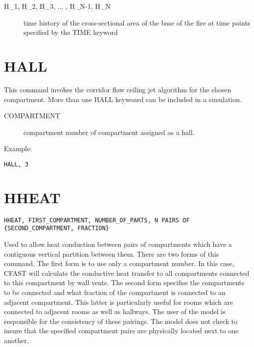 \begin{adjustwidth}{1cm}{0cm}
\begin{description}
  \item[H\_1, H\_2, H\_3, ... , H\_N-1, H\_N] time history of the cross-sectional area of the base of the fire at time points specified by the TIME keyword
\end{description}
\end{adjustwidth}

\section{HALL}

This command invokes the corridor flow ceiling jet algorithm for the chosen compartment. More than one HALL keywoard can be included in a simulation.

\begin{adjustwidth}{1cm}{0cm}
\begin{description}
  \item[COMPARTMENT] compartment number of compartment assigned as a hall.
\end{description}
\end{adjustwidth}

\noindent Example:

\begin{lstlisting}
HALL, 3
\end{lstlisting}

\section{HHEAT}

\begin{lstlisting}
HHEAT, FIRST_COMPARTMENT, NUMBER_OF_PARTS, N PAIRS OF {SECOND_COMPARTMENT, FRACTION}
\end{lstlisting}

Used to allow heat conduction between pairs of compartments which have a contiguous vertical partition between them.  There are two forms of this command. The first form is to use only a compartment number. In this case, CFAST will calculate the conductive heat transfer to all compartments connected to this compartment by wall vents. The second form specifies the compartments to be connected and what fraction of the compartment is connected to an adjacent compartment. This latter is particularly useful for rooms which are connected to adjacent rooms as well as hallways. The user of the model is responsible for the consistency of these pairings.  The model does not check to insure that the specified compartment pairs are physically located next to one another.

